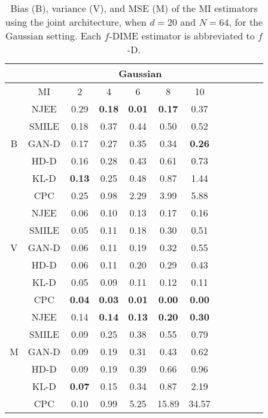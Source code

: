 \begin{table}
\caption{Bias (B), variance (V), and MSE (M) of the MI estimators using the joint architecture, when $d=20$ and $N=64$, for the Gaussian setting. Each $f$-DIME estimator is abbreviated to $f$-D.} 
\setlength{\arrayrulewidth}{0.5mm}
\centering
    \begin{tabular}{ |c|c|c c c c c|c c c c c| } 
     \hline
     & & \multicolumn{5}{|c|}{Gaussian} \\
     \hline
     & MI & 2 & 4 & 6 & 8 & 10 \\
     \hline
      & NJEE & 0.29 & \textbf{0.18} & \textbf{0.01} & \textbf{0.17} & 0.37 \\
      & SMILE & 0.18 & 0.37 & 0.44 & 0.50 & 0.52\\
      B & GAN-D & 0.17 & 0.27 & 0.35 & 0.34 & \textbf{0.26} \\
      & HD-D & 0.16 & 0.28 & 0.43 & 0.61 & 0.73  \\
      & KL-D & \textbf{0.13} & 0.25 & 0.48 & 0.87 & 1.44  \\
      & CPC & 0.25 & 0.98 & 2.29 & 3.99 & 5.88  \\
     \hline
     & NJEE & 0.06 & 0.10 & 0.13 & 0.17 & 0.16 \\
      & SMILE & 0.05 & 0.11 & 0.18 & 0.30 & 0.51  \\
      V & GAN-D & 0.06 & 0.11 & 0.19 & 0.32 & 0.55 \\
      & HD-D & 0.06 & 0.11 & 0.20 & 0.29 & 0.43  \\
      & KL-D & 0.05 & 0.09 & 0.11 & 0.12 & 0.11 \\
      & CPC & \textbf{0.04} & \textbf{0.03} & \textbf{0.01} & \textbf{0.00} & \textbf{0.00}  \\
     \hline
     & NJEE & 0.14 & \textbf{0.14} & \textbf{0.13} & \textbf{0.20} & \textbf{0.30}  \\
      & SMILE & 0.09 & 0.25 & 0.38 & 0.55 & 0.79 \\
      M & GAN-D & 0.09 & 0.19 & 0.31 & 0.43 & 0.62  \\
      & HD-D & 0.09 & 0.19 & 0.39 & 0.66 & 0.96  \\
      & KL-D & \textbf{0.07} & 0.15 & 0.34 & 0.87 & 2.19  \\
      & CPC & 0.10 & 0.99& 5.25 & 15.89 & 34.57  \\
     \hline
    \end{tabular}
    \label{tab:MI_bias_var_mse_gauss_d_varying2}
\end{table}

